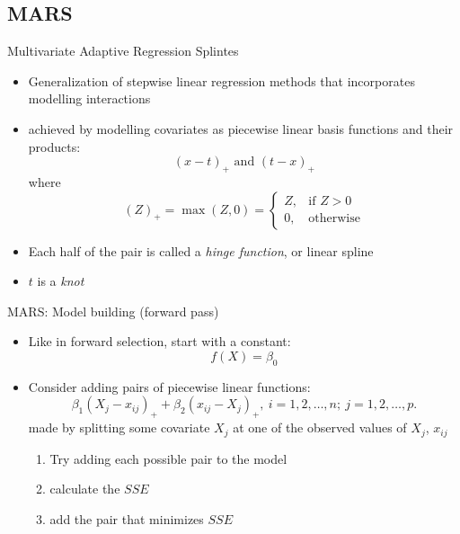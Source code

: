 \documentclass[handout]{beamer}
\begin{document}

\subsection{MARS} %
\label{ssub:mars}

\begin{frame}{Multivariate Adaptive Regression Splintes}
  \begin{itemize}[<+->]
    \item Generalization of stepwise linear regression methods that incorporates modelling interactions
    \item achieved by modelling covariates as piecewise linear basis functions and their products:
  \begin{equation*} \label{eq:bases}
    (x - t)_{+} \text{ and } (t - x)_{+}
  \end{equation*} where
  \begin{equation*}
    (Z)_{+} = \max(Z, 0) = \begin{cases}
    Z, & \text{if } Z > 0 \\
    0, & \text{otherwise}
    \end{cases}
  \end{equation*}
  
  \item Each half of the pair is called a \emph{hinge function}, or linear spline
  \item $t$ is a \emph{knot}
  \end{itemize}
\end{frame}

\begin{frame}{MARS: Model building (forward pass)}
  
  \begin{itemize}[<+->]
    \item Like in forward selection, start with a constant:
    \begin{equation*}
      f(X) = \beta_{0}
    \end{equation*}
    \item Consider adding pairs of piecewise linear functions:
  \begin{equation*}
  \beta_{1} (X_{j} - x_{ij})_{+} + \beta_{2}(x_{ij} - X_{j})_{+}, \ i = 1, 2, \ldots, n; \ j = 1, 2, \ldots, p.
  \end{equation*}
   made by splitting some covariate $X_{j}$ at one of the observed values of $X_{j}$, $x_{ij}$
  \begin{enumerate}
    \item Try adding each possible pair to the model
    \item calculate the $SSE$
    \item add the pair that minimizes $SSE$
  \end{enumerate}
  \end{itemize}

\end{frame}
\end{document}
